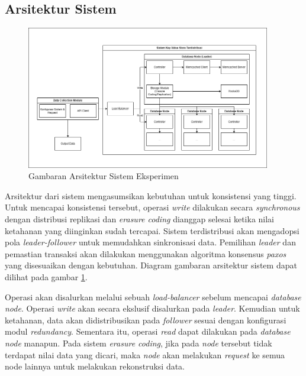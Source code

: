 \subsection{Arsitektur Sistem}
\label{subsection:system-architecture}

\begin{figure}[ht]
    \centering
    \includegraphics[width=0.95\textwidth]{resources/chapter-3/general-architecture.png}
    \caption{Gambaran Arsitektur Sistem Eksperimen}
    \label{fig:general-architecture}
\end{figure}

Arsitektur dari sistem mengasumsikan kebutuhan untuk konsistensi yang tinggi. Untuk mencapai konsistensi tersebut, operasi \textit{write} dilakukan secara \textit{synchronous} dengan distribusi replikasi dan \textit{erasure coding} dianggap selesai ketika nilai ketahanan yang diinginkan sudah tercapai. Sistem terdistribusi akan mengadopsi pola \textit{leader-follower} untuk memudahkan sinkronisasi data. Pemilihan \textit{leader} dan pemastian transaksi akan dilakukan menggunakan algoritma konsensus \textit{paxos} yang disesuaikan dengan kebutuhan. Diagram gambaran arsitektur sistem dapat dilihat pada gambar \ref{fig:general-architecture}.

Operasi akan disalurkan melalui sebuah \textit{load-balancer} sebelum mencapai \textit{database node}. Operasi \textit{write} akan secara ekslusif disalurkan pada \textit{leader}. Kemudian untuk ketahanan, data akan didistribusikan pada \textit{follower} sesuai dengan konfigurasi modul \textit{redundancy}. Sementara itu, operasi \textit{read} dapat dilakukan pada \textit{database node} manapun. Pada sistem \textit{erasure coding}, jika pada \textit{node} tersebut tidak terdapat nilai data yang dicari, maka \textit{node} akan melakukan \textit{request} ke semua node lainnya untuk melakukan rekonstruksi data.
